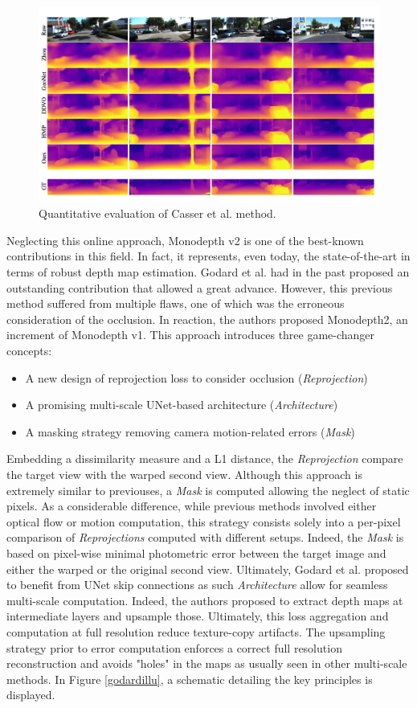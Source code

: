\begin{figure}[h]
	\centering
	\includegraphics[width=0.8\linewidth]{Figures/SOA/casserillu}
	\caption[Quantitative evaluation of Casser et al. method.]{Quantitative evaluation of Casser et al. \cite{casser2019depth} method.}
	\label{casserillu}
\end{figure}


Neglecting this online approach, Monodepth v2 \cite{godard2019digging} is one of the best-known contributions in this field. In fact, it represents, even today, the state-of-the-art in terms of robust depth map estimation. Godard et al. \cite{godard2019digging} had in the past proposed an outstanding contribution that allowed a great advance. However, this previous method suffered from multiple flaws, one of which was the erroneous consideration of the occlusion. In reaction, the authors proposed Monodepth2, an increment of Monodepth v1.
This approach introduces three game-changer concepts:
\begin{itemize}
	\item A new design of reprojection loss to consider occlusion (\textit{Reprojection})
	\item A promising multi-scale UNet-based architecture  (\textit{Architecture})
	\item A masking strategy removing camera motion-related errors (\textit{Mask})
\end{itemize}

Embedding a dissimilarity measure and a L1 distance, the \textit{Reprojection} compare the target view with the warped second view. Although this approach is extremely similar to previouses, a \textit{Mask} is computed allowing the neglect of static pixels. As a considerable difference, while previous methods involved either optical flow or motion computation, this strategy consists solely into a per-pixel comparison of \textit{Reprojections} computed with different setups. Indeed, the \textit{Mask} is based on pixel-wise minimal photometric error between the target image and either the warped or the original second view.
Ultimately, Godard et al. proposed to benefit from UNet \cite{ronneberger2015u} skip connections as such \textit{Architecture} allow for seamless multi-scale computation. Indeed, the authors proposed to extract depth maps at intermediate layers and upsample those. Ultimately, this loss aggregation and computation at full resolution reduce texture-copy artifacts. The upsampling strategy prior to error computation enforces a correct full resolution reconstruction and avoids "holes" in the maps as usually seen in other multi-scale methods.
In Figure \ref{godardillu}, a schematic detailing the key principles is displayed.

